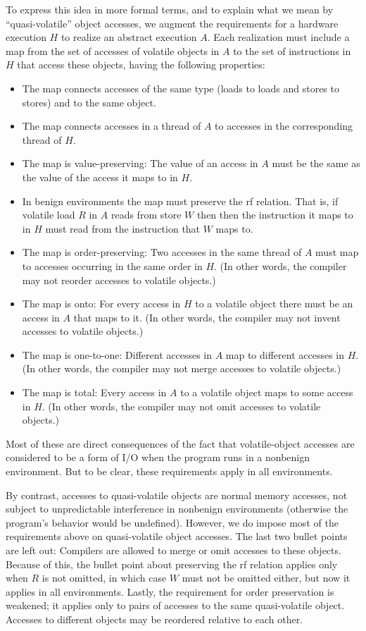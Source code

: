 To express this idea in more formal terms,
and to explain what we mean by ``quasi-volatile'' object accesses,
we augment the
requirements for a hardware execution $H$ to realize an abstract
execution $A$.
Each realization must include a map from the set of accesses of
volatile objects in $A$ to the set of instructions in $H$ that access
these objects, having the following properties:
\begin{itemize}
\item	The map connects accesses of the same type (loads to loads
	and stores to stores) and to the same object.
\item	The map connects accesses in a thread of $A$ to accesses in
	the corresponding thread of $H$.
\item	The map is value-preserving: The value of an access in $A$ must be
	the same as the value of the access it maps to in $H$.
\item	In benign environments the map must preserve the rf relation.
	That is, if volatile load $R$ in $A$ reads from store $W$ then
	then the instruction it maps to in $H$ must read from the
	instruction that $W$ maps to.
\item	The map is order-preserving: Two accesses in the same thread
	of $A$ must map to accesses occurring in the same order in $H$.
	(In other words, the compiler may not reorder accesses
	to volatile objects.)
\item	The map is onto: For every access in $H$ to a volatile object
	there must be an access in $A$ that maps to it.
	(In other words, the compiler may not invent accesses to
	volatile objects.)
\item	The map is one-to-one: Different accesses in $A$ map to
	different accesses in $H$.
	(In other words, the compiler may not merge accesses to
	volatile objects.)
\item	The map is total: Every access in $A$ to a volatile object
	maps to some access in $H$.
	(In other words, the compiler may not omit accesses to
	volatile objects.)
\end{itemize}
Most of these are direct consequences of the fact that volatile-object
accesses are considered to be a form of I/O when the program runs
in a nonbenign environment.
But to be clear, these requirements apply in all environments.

By contrast, accesses to quasi-volatile objects are normal memory
accesses, not subject to unpredictable interference in nonbenign
environments (otherwise the program's behavior would be undefined).
However, we do impose most of the requirements above on quasi-volatile
object accesses.
The last two bullet points are left out: Compilers are allowed to merge or
omit accesses to these objects.
Because of this, the bullet point about preserving the rf relation
applies only when $R$ is not omitted, in which case $W$ must not
be omitted either, but now it applies in all environments.
Lastly, the requirement for order preservation is weakened; it applies
only to pairs of accesses to the same quasi-volatile object.
Accesses to different objects may be reordered relative to each other.

